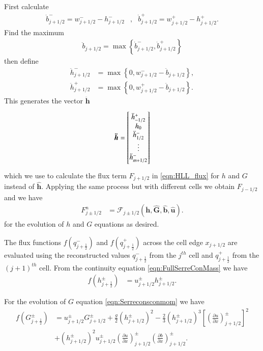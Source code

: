 \documentclass[times]{elsarticle}
\newcommand\TM{\rule{0pt}{2.8ex }}       %
\newcommand\BM{\rule[-2ex]{0pt}{2ex }} %
\newcommand{\vecn}[1]{\boldsymbol{#1}}
\begin{document}
First calculate
\begin{align}
\dot{b}^-_{j+1/2} = w^-_{j+1/2} - h^-_{j+1/2} &, &\dot{b}^+_{j+1/2} = w^+_{j+1/2} - h^+_{j+1/2}.
\label{eqn:BedReDefWmH}
\end{align}
Find the maximum
\begin{align*}
\ddot{b}_{j+1/2} = \max\left\lbrace\dot{b}^-_{j+1/2} , \dot{b}^+_{j+1/2} \right\rbrace
\end{align*}
then define
\begin{subequations}
	\begin{align}
	\ddot{h}^-_{j+1/2} &= \max\left\lbrace 0, w^-_{j+1/2} - \ddot{b}_{j+1/2}  \right\rbrace, \\  \ddot{h}^+_{j+1/2} &= \max\left\lbrace 0, w^+_{j+1/2} - \ddot{b}_{j+1/2} \right\rbrace.
	\end{align}
	\label{eqn:ModifiedHValue}
\end{subequations}
This generates the vector $\vecn{\ddot{h}}$
\begin{equation*}
\vecn{\ddot{h}}= \begin{bmatrix} \TM
\ddot{h}^+_{-1/2} \\ h_0 \\ \ddot{h}^-_{1/2} \\ \vdots  \\ \ddot{h}^-_{m + 1/2}  \BM \end{bmatrix}
\end{equation*}
which we use to calculate the flux term $F_{j+1/2}$ in \eqref{eqn:HLL_flux} for $h$ and $G$ instead of $\vecn{\hat{h}}$. Applying the same process but with different cells we obtain $F_{j-1/2}$ and we have
\begin{align*}	
F^n_{j\pm 1/2} &=\mathcal{F}_{j\pm1/2} \left(\vecn{\ddot{h}}, \vecn{\hat{G}},\vecn{\hat{b}}, \vecn{\hat{u}}  \right).
\end{align*}
for the evolution of $h$ and $G$ equations as desired.

The flux functions $f(q^-_{j+\frac{1}{2}})$ and $f(q^+_{j+\frac{1}{2}})$ across the cell edge $x_{j+1/2}$ are evaluated using the reconstructed values $q^-_{j+\frac{1}{2}}$ from the $j^{th}$ cell and $q^+_{j+\frac{1}{2}}$ from the $(j+1)^{th}$ cell. From the continuity equation \eqref{eqn:FullSerreConMass} we have
\begin{align*}
f\left(h^\pm_{j+\frac{1}{2}}\right) &= u^\pm_{j + 1/2}  h^\pm_{j + 1/2}.
\end{align*}

For the evolution of $G$ equation \eqref{eqn:Serreconsconmom} we have 
\begin{align}
f\left(G^\pm_{j+\frac{1}{2}}\right) &=  u^\pm_{j + 1/2} G^\pm_{j + 1/2}  + \frac{g}{2}\left(h^\pm_{j + 1/2} \right)^2 - \frac{2}{3}\left(h^\pm_{j + 1/2}\right)^3 \left[\left(\frac{\partial {u}}{\partial x} \right)^\pm_{j + 1/2} \right]^2 \nonumber\\ &+ \left(h^\pm_{j + 1/2}\right)^2 u^\pm_{j + 1/2} \left(\frac{\partial {u}}{\partial x} \right)^\pm_{j + 1/2} \left(\frac{\partial b}{\partial x} \right)^\pm_{j + 1/2} .
\label{eqn:FluxIrrotNum}
\end{align}
\end{document}
